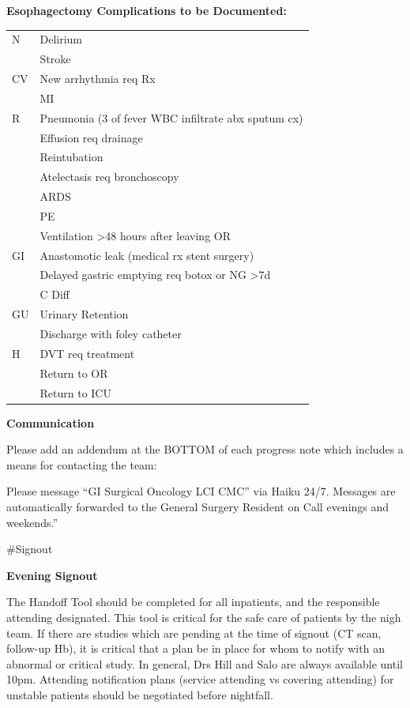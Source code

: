 \documentclass[
]{book}
\begin{document}
\textbf{Esophagectomy Complications to be Documented:}

\begin{longtable}[]{@{}ll@{}}
\toprule\noalign{}
\endhead
\bottomrule\noalign{}
\endlastfoot
N & Delirium \\
& Stroke \\
CV & New arrhythmia req Rx \\
& MI \\
R & Pneumonia (3 of fever \textbar{} WBC \textbar{} infiltrate \textbar{} abx \textbar{} sputum cx) \\
& Effusion req drainage \\
& Reintubation \\
& Atelectasis req bronchoscopy \\
& ARDS \\
& PE \\
& Ventilation \textgreater48 hours after leaving OR \\
GI & Anastomotic leak (medical rx \textbar{} stent \textbar{} surgery) \\
& Delayed gastric emptying req botox or NG \textgreater7d \\
& C Diff \\
GU & Urinary Retention \\
& Discharge with foley catheter \\
H & DVT req treatment \\
& Return to OR \\
& Return to ICU \\
\end{longtable}

\textbf{Communication}

Please add an addendum at the BOTTOM of each progress note which includes a means for contacting the team:

Please message ``GI Surgical Oncology LCI CMC'' via Haiku 24/7. Messages are automatically forwarded to the General Surgery Resident on Call evenings and weekends.''

\#Signout

\textbf{Evening Signout}

The Handoff Tool should be completed for all inpatients, and the responsible attending designated. This tool is critical for the safe care of patients by the nigh team. If there are studies which are pending at the time of signout (CT scan, follow-up Hb), it is critical that a plan be in place for whom to notify with an abnormal or critical study. In general, Drs Hill and Salo are always available until 10pm. Attending notification plans (service attending vs covering attending) for unstable patients should be negotiated before nightfall.
\end{document}
